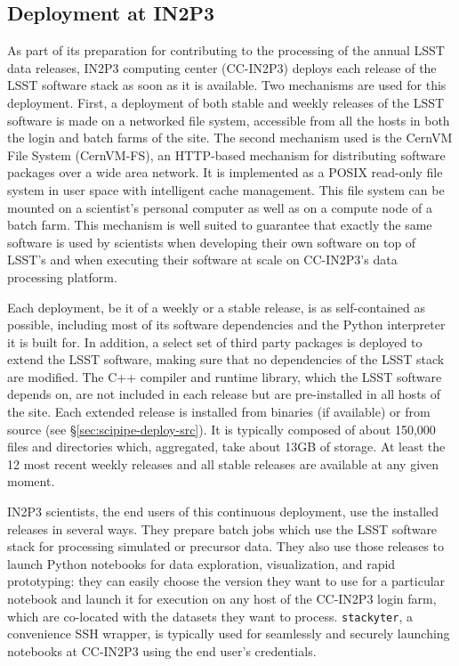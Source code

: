 \subsection{Deployment at IN2P3}

As part of its preparation for contributing to the processing of the annual LSST data releases, IN2P3 computing center (CC-IN2P3) deploys each  release of the LSST software stack as soon as it is  available.
Two mechanisms are used for this deployment. First, a deployment of both stable and weekly releases of the LSST software is made on a networked file system, accessible from all the hosts in both the login and batch farms of the site. The second mechanism used is the CernVM File System (CernVM-FS)\cite{1742-6596-331-4-042003}, an HTTP-based mechanism for distributing software packages over a wide area network. It is implemented as a POSIX read-only file system in user space with intelligent cache management. This file system can be mounted on a scientist's personal computer as well as on a compute node of a batch farm. This mechanism is well suited to guarantee that exactly the same software is used by scientists when developing their own software on top of LSST's and when executing their software at scale on CC-IN2P3's data processing platform.

Each deployment, be it of a weekly or a stable release, is as self-contained as possible, including most of its software dependencies and the Python interpreter it is built for. In addition, a select set of third party packages is deployed to extend the LSST software, making sure that no dependencies of the LSST stack are modified. The C++ compiler and runtime library, which the LSST software depends on, are not included in each release but are pre-installed in all hosts of the site.
Each extended release is installed from binaries (if available) or from source (see \S\ref{sec:scipipe-deploy-src}). It is typically composed of about 150,000 files and directories which, aggregated, take about 13GB of storage. At least the 12 most recent weekly releases and all stable releases are available at any given moment.

IN2P3 scientists, the end users of this continuous deployment, use the installed releases in several ways. They prepare batch jobs which use the LSST software stack for processing simulated or precursor data. They also use those releases to launch Python notebooks for data exploration, visualization, and rapid prototyping: they can easily choose the version they want to use for a particular notebook and launch it for execution on any host of the CC-IN2P3 login farm, which are co-located with the datasets they want to process.
\texttt{stackyter}\cite{stackyter}, a convenience SSH wrapper, is typically used for seamlessly and securely launching notebooks at CC-IN2P3 using the end user's credentials.


